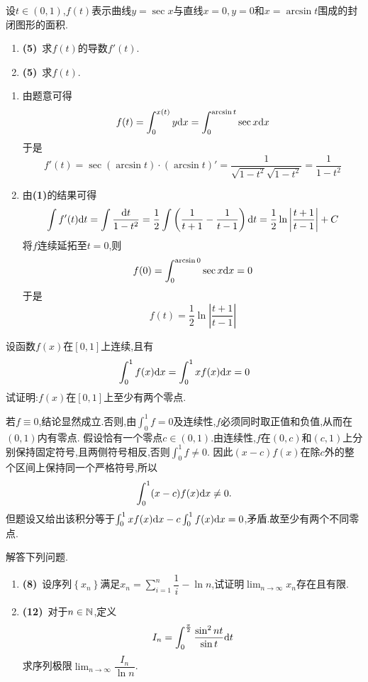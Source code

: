 \documentclass{ctexart}
\begin{document}
\begin{problem}[5.(10\songti{分})]
    设$t\in(0,1)$,$f(t)$表示曲线$y=\sec x$与直线$x=0,y=0$和$x=\arcsin t$围成的封闭图形的面积.
    \begin{enumerate}[label=\textbf{(\arabic*)}]
        \item \textbf{(5)}\ 求$f(t)$的导数$f'(t)$.
        \item \textbf{(5)}\ 求$f(t)$.
    \end{enumerate}
\end{problem}
\begin{solution}
    \begin{enumerate}[label=\textbf{(\arabic*)}]
        \item 由题意可得$$f(t)=\int_{0}^{x(t)}y\mathrm{d} x=\int_0^{\arcsin{t}}\sec x\mathrm{d} x$$
            于是$$f'(t)=\sec(\arcsin t)\cdot\left(\arcsin t\right)'=\dfrac{1}{\sqrt{1-t^2}\sqrt{1-t^2}}=\dfrac{1}{1-t^2}$$
        \item 由\textbf{(1)}的结果可得
            $$\int f'(t)\mathrm{d} t=\int\dfrac{\mathrm{d} t}{1-t^2}=\dfrac{1}{2}\int\left(\dfrac{1}{t+1}-\dfrac{1}{t-1}\right)\mathrm{d} t=\dfrac{1}{2}\ln\left|\dfrac{t+1}{t-1}\right|+C$$
            将$f$连续延拓至$t=0$,则$$f(0)=\int_0^{\arcsin0}\sec x\mathrm{d} x=0$$
            于是$$f(t)=\dfrac{1}{2}\ln\left|\dfrac{t+1}{t-1}\right|$$
    \end{enumerate}
\end{solution}
\begin{problem}[6.(10\songti{分})]
    设函数$f(x)$在$[0,1]$上连续,且有$$\int_0^1f(x)\mathrm{d} x=\int_0^1xf(x)\mathrm{d} x=0$$试证明:$f(x)$在$[0,1]$上至少有两个零点.
\end{problem}
\begin{solution}
若$f\equiv0$,结论显然成立.否则,由$\int_0^1f=0$及连续性,$f$必须同时取正值和负值,从而在$(0,1)$内有零点.
    假设恰有一个零点$c\in(0,1)$.由连续性,$f$在$(0,c)$和$(c,1)$上分别保持固定符号,且两侧符号相反,否则$\int_0^1f\neq0$.
    因此$(x-c)f(x)$在除$c$外的整个区间上保持同一个严格符号,所以
    \[\int_0^1(x-c)f(x)\mathrm{d} x\neq0.\]
    但题设又给出该积分等于$\int_0^1xf(x)\mathrm{d} x-c\int_0^1f(x)\mathrm{d} x=0$,矛盾.故至少有两个不同零点.
\end{solution}
\begin{problem}[7.(20\songti{分})]
    解答下列问题.
    \begin{enumerate}[label=\textbf{(\arabic*)}]
        \item \textbf{(8)}\ 设序列$\left\{x_n\right\}$满足$\displaystyle x_n=\sum_{i=1}^n\dfrac{1}{i}-\ln n$,试证明$\displaystyle\lim_{n\to\infty}x_n$存在且有限.
        \item \textbf{(12)}\ 对于$n\in\mathbb{N}$,定义$$I_n=\int_0^\frac{\pi}{2}\dfrac{\sin^2nt}{\sin t}\mathrm{d} t$$求序列极限$\displaystyle\lim_{n\to\infty}\dfrac{I_n}{\ln n}$.
    \end{enumerate}
\end{problem}
\end{document}
